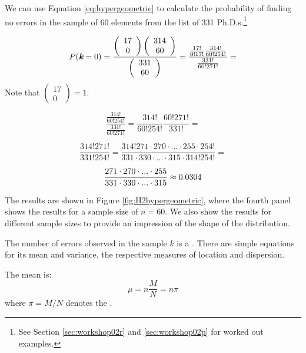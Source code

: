 We can use Equation \ref{eq:hypergeometric} to calculate the probability of finding no errors in the sample of 60 elements from the list of 331 Ph.D.s.\footnote{See Section \ref{sec:workshop02r} and \ref{sec:workshop02p} for worked out examples.}

\begin{equation*}
P(\textit{\textbf{k}} = 0) = \frac{
\left( \begin{array}{c}17\\0\end{array} \right)
\left( \begin{array}{c}314\\60\end{array} \right)}
{\left( \begin{array}{c}331\\60\end{array} \right)} = 
\frac{\frac{17!}{0!17!} \frac{314!}{60!254!}}{\frac{331!}{60!271!}} =
\end{equation*}
Note that $\left( \begin{array}{c}17\\0\end{array} \right) = 1$.

\begin{equation*}
\frac{\frac{314!}{60!254!}}{\frac{331!}{60!271!}} = \frac{314!}{60!254!} \frac{60!271!}{331!} =
\end{equation*}

\begin{equation*}
\frac{314! 271!}{331! 254!} = \frac{314! 271 \cdot 270 \cdot ... \cdot 255 \cdot 254!}{331 \cdot 330 \cdot ... \cdot 315 \cdot 314! 254!} =
\end{equation*}

\begin{equation*}
\frac{271 \cdot 270 \cdot ... \cdot 255 }{331 \cdot 330 \cdot ... \cdot 315} \approx \ProbZeroErrorProbability
\end{equation*}

The results are shown in Figure \ref{fig:H2hypergeometric}, where the fourth panel shows the results for a sample size of $n = 60$. We also show the results for different sample sizes to provide an impression of the shape of the distribution.

\bigskip
The number of errors observed in the sample $k$ is a . There are simple equations for its mean and variance, the respective measures of location and dispersion.

\bigskip
The mean is:
\begin{equation}
\mu = n \frac{M}{N} = n \pi
\end{equation}
where $\pi = M / N$ denotes the .

